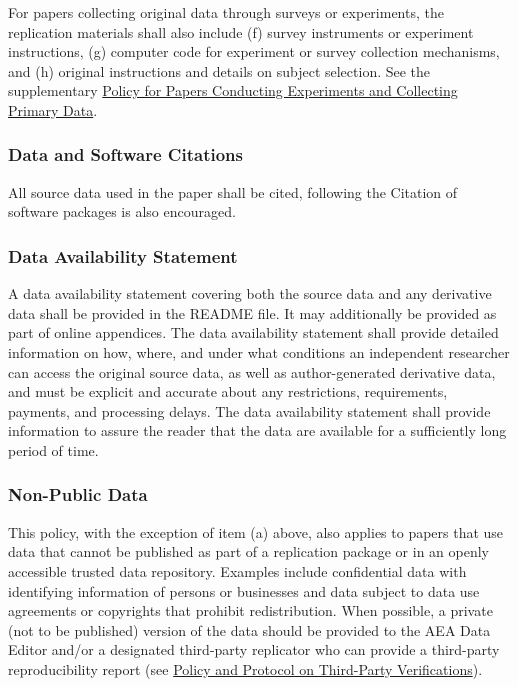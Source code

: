 For papers collecting original data through surveys or experiments, the
replication materials shall also include (f) survey instruments or
experiment instructions, (g) computer code for experiment or survey
collection mechanisms, and (h) original instructions and details on
subject selection. See the supplementary 
\hyperref[policy-for-papers-conducting-experiments-and-collecting-primary-data]{Policy for Papers Conducting Experiments and Collecting Primary  Data}.

\subsubsection{Data and Software
Citations}\label{data-and-software-citations}

All source data used in the paper shall be cited, following the
Citation of software packages is also encouraged.

\subsubsection{Data Availability
Statement}\label{data-availability-statement}

A data availability statement covering both the source data and any
derivative data shall be provided in the README file. It may
additionally be provided as part of online appendices. The data
availability statement shall provide detailed information on how, where,
and under what conditions an independent researcher can access the
original source data, as well as author-generated derivative data, and
must be explicit and accurate about any restrictions, requirements,
payments, and processing delays. The data availability statement shall
provide information to assure the reader that the data are available for
a sufficiently long period of time.

\subsubsection{Non-Public Data}\label{non-public-data}

This policy, with the exception of item (a) above, also applies to
papers that use data that cannot be published as part of a replication
package or in an openly accessible trusted data repository. Examples
include confidential data with identifying information of persons or
businesses and data subject to data use agreements or copyrights that
prohibit redistribution. When possible, a private (not to be published)
version of the data should be provided to the AEA Data Editor and/or a
designated third-party replicator who can provide a third-party reproducibility report (see \hyperref[policy-and-protocol-on-third-party-verifications]{Policy and Protocol on Third-Party Verifications}).

